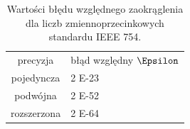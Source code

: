 \begin{table}[h]
        \centering
        \begin{threeparttable}
                \caption{Wartości błędu względnego zaokrąglenia dla liczb zmiennoprzecinkowych standardu IEEE 754.}\label{tab:table_exampleazd}
                \begin{tabularx}{0.6\textwidth}{| c | X |}
                        \midrule
                        	precyzja	&	błąd względny $\Epsilon$ \\
		pojedyncza  &  2 E-23\\
                        podwójna  &  2 E-52\\
		rozszerzona &  2 E-64\\
                        \bottomrule
                \end{tabularx}
        \end{threeparttable}
\end{table}



